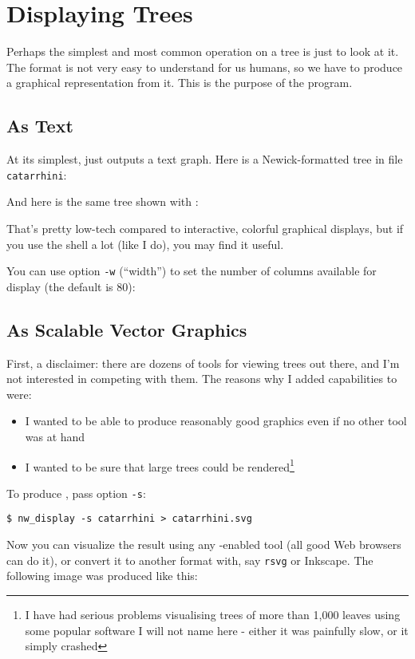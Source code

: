 
\section{Displaying Trees}
\label{sct_display}

Perhaps the simplest and most common operation on a \nw{} tree is just to look
at it. The \nw{} format is not very easy to understand for us humans, so we
have to produce a graphical representation from it. This is the purpose of the
\display{} program. 

\subsection{As Text}
\label{sct_display_text}

At its simplest, \display{} just outputs a text graph. Here is a
Newick-formatted tree in file \texttt{catarrhini}:

And here is the same tree shown with \display{}:

\begin{samepage}

\end{samepage}
That's pretty low-tech compared to interactive, colorful graphical displays,
but if you use the shell a lot (like I do), you may find it useful.

You can use option \texttt{-w} (``width'') to set the number of columns
available for display (the default is 80):


\begin{samepage}

\end{samepage}

\subsection[As SVG]{As Scalable Vector Graphics}
\label{sct_display_svg}

First, a disclaimer: there are dozens of tools for viewing trees out there, and
I'm not interested in competing with them. The reasons why I added \svg{}
capabilities to \display{} were:
\begin{itemize}
\item I wanted to be able to produce reasonably good graphics even if no other
tool was at hand
\item I wanted to be sure that large trees could be rendered\footnote{I have had serious problems
visualising trees of more than 1,000 leaves using some popular software I will
not name here - either it was painfully slow, or it simply crashed}
\end{itemize}
To produce \svg, pass option \texttt{-s}:
\begin{verbatim}
$ nw_display -s catarrhini > catarrhini.svg
\end{verbatim}
Now you can visualize the result using any \svg-enabled tool (all good Web browsers can do it), or convert it to another format with, say \texttt{rsvg} or Inkscape. The following \pdf{} image was produced like this:

